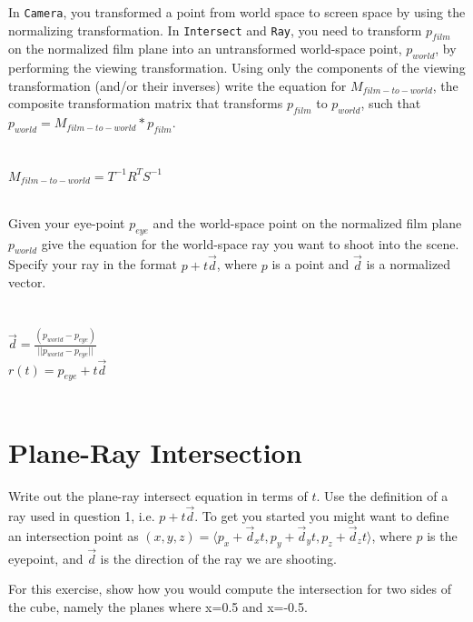 \documentclass[10pt,twocolumn]{article}
\begin{document}
\begin{framed}
\noindent {\bf [1 point]} In {\tt Camera}, you transformed a point from world space to screen space by using the normalizing transformation. In {\tt Intersect} and {\tt Ray}, you need to transform $p_{film}$ on the normalized film plane into an untransformed world-space point, $p_{world}$, by performing the viewing transformation. Using only the components of the viewing transformation (and/or their inverses) write the equation for $M_{film-to-world}$, the composite transformation matrix that transforms $p_{film}$ to $p_{world}$, such that $p_{world} = M_{film-to-world} * p_{film}$.\\\\\\
$M_{film-to-world} = T^{-1}R^{T}S^{-1}$\\\\
\end{framed}

\begin{framed}
\noindent {\bf [1 point]} Given your eye-point $p_{eye}$ and the world-space point on the normalized film plane $p_{world}$ give the equation for the world-space ray you want to shoot into the scene. Specify your ray in the format $p + t\vec{d}$, where $p$ is a point and $\vec{d}$ is a normalized vector. \\\\\\

$\vec{d} = \frac{(p_{world} - p_{eye})}{||p_{world} - p_{eye}||}$\\

$r(t) = p_{eye} + t\vec{d}$\\\\
\end{framed}

\section{Plane-Ray Intersection}

Write out the plane-ray intersect equation in terms of $t$. Use the definition of a ray used in question 1, i.e. $p + t\vec{d}$. To get you started you might want to define
an intersection point as $(x, y, z) = \langle p_x + \vec{d}_xt, p_y + \vec{d}_yt, p_z + \vec{d}_zt\rangle$, where $p$ is the eyepoint, and $\vec{d}$ is the direction of the ray we are shooting. 

For this exercise, show how you would compute the intersection for two sides of the cube, namely the planes where x=0.5 and x=-0.5.
\end{document}
